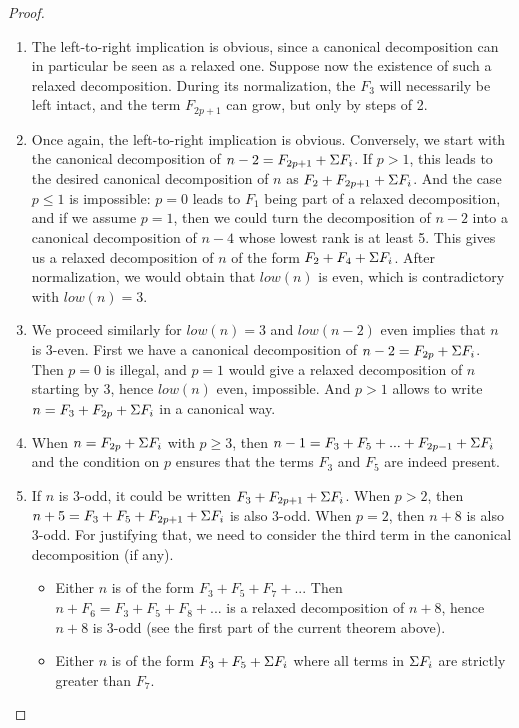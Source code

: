 \documentclass[a4paper,11pt]{article}
\begin{document}
\begin{proof}
\noindent
\begin{enumerate}
\item
  The left-to-right implication is obvious, since a canonical
  decomposition can in particular be seen as a relaxed one. Suppose
  now the existence of such a relaxed decomposition. During its
  normalization, the $F_3$ will necessarily be left intact, and the
  term $F_{2p+1}$ can grow, but only by steps of 2.
\item Once again, the left-to-right implication is
  obvious. Conversely, we start with the canonical decomposition of
  $n-2=F_{2p+1}+\Sigma F_i$. If $p>1$, this leads to the desired canonical
  decomposition of $n$ as $F_2+F_{2p+1}+\Sigma F_i$. And the case $p\le 1$ is
  impossible: $p=0$ leads to $F_1$ being part of a relaxed
  decomposition, and if we assume $p=1$, then we could turn the
  decomposition of $n-2$ into a canonical decomposition of $n-4$
  whose lowest rank is at least 5. This gives us a relaxed
  decomposition of $n$ of the form $F_2+F_4+\Sigma F_i$. After normalization,
  we would obtain that $low(n)$ is even, which is contradictory with
  $low(n)=3$.
\item We proceed similarly for $low(n)=3$ and $low(n-2)$ even implies
  that $n$ is 3-even. First we have a canonical decomposition of
  $n-2 = F_{2p} + \Sigma F_i$. Then $p=0$ is illegal, and $p=1$
  would give a relaxed
  decomposition of $n$ starting by 3, hence $low(n)$ even, impossible.
  And $p>1$ allows to write $n = F_3+F_{2p}+\Sigma F_i$ in a canonical way.
\item When $n = F_{2p}+\Sigma F_i$ with $p\ge 3$, then
  $n-1 = F_3+F_5+...+F_{2p-1}+\Sigma F_i$
  and the condition on $p$ ensures that the terms $F_3$ and $F_5$ are
  indeed present.
\item If $n$ is 3-odd, it could be written $F_3+F_{2p+1}+\Sigma F_i$.
  When $p>2$, then $n+5 = F_3+F_5+F_{2p+1}+\Sigma F_i$ is also 3-odd.
  When $p=2$, then $n+8$ is also 3-odd. For justifying that,
  we need to consider the third term in the 
  canonical decomposition (if any).
  \begin{itemize}
  \item Either $n$ is of the form $F_3+F_5+F_7+...$
    Then $n+F_6 = F_3 + F_5 + F_8 + ...$ is a relaxed
    decomposition of $n+8$, hence $n+8$ is 3-odd (see the first
    part of the current theorem above).
  \item Either $n$ is of the form $F_3+F_5+\Sigma F_i$
    where all terms in $\Sigma F_i$ are strictly greater than $F_7$.

\end{itemize}
\end{enumerate}
\end{proof}
\end{document}
